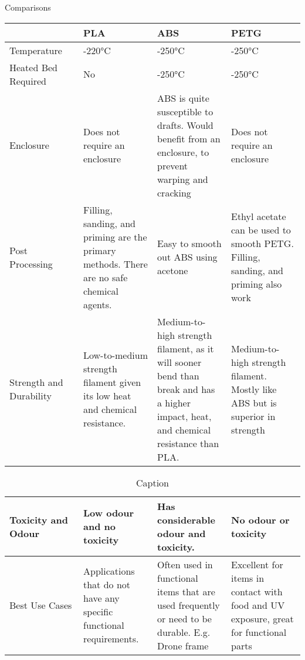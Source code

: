 \documentclass[class=report,11pt,crop=false]{standalone}
\begin{document}
Comparisons
\begin{table}[h]
\centering
\begin{tabular}{|>{\raggedright\arraybackslash}p{0.25\linewidth}|>{\raggedright\arraybackslash}p{0.25\linewidth}|>{\raggedright\arraybackslash}p{0.25\linewidth}|>{\raggedright\arraybackslash}p{0.25\linewidth}|}
\hline
 & \textbf{PLA} & \textbf{ABS} & \textbf{PETG} \\ \hline
Temperature & 180-220°C & 210-250°C & 220-250°C \\ \hline
Heated Bed Required & No & 210-250°C & 220-250°C \\ \hline
Enclosure & Does not require an enclosure & ABS is quite susceptible to drafts. Would benefit from an enclosure, to prevent warping and cracking & Does not require an enclosure \\ \hline
Post Processing & Filling, sanding, and priming are the primary methods. There are no safe chemical agents. & Easy to smooth out ABS using acetone & Ethyl acetate can be used to smooth PETG. Filling, sanding, and priming also work \\ \hline
Strength and Durability & Low-to-medium strength filament given its low heat and chemical resistance. & Medium-to-high strength filament, as it will sooner bend than break and has a higher impact, heat, and chemical resistance than PLA. & Medium-to-high strength filament. Mostly like ABS but is superior in strength \\ \hline

\end{tabular}
\end{table}


\begin{table}
    \centering
    \begin{tabular}{|>{\centering\arraybackslash}p{0.25\linewidth}|>{\centering\arraybackslash}p{0.25\linewidth}|>{\centering\arraybackslash}p{0.25\linewidth}|>{\centering\arraybackslash}p{0.25\linewidth}|} \hline 
Toxicity and Odour & Low odour and no toxicity & Has considerable odour and toxicity. & No odour or toxicity \\ \hline
Best Use Cases & Applications that do not have any specific functional requirements. & Often used in functional items that are used frequently or need to be durable. E.g. Drone frame & Excellent for items in contact with food and UV exposure, great for functional parts \\ \hline
    \end{tabular}
    \caption{Caption}
    \label{tab:my_label1}
\end{table}
\end{document}
